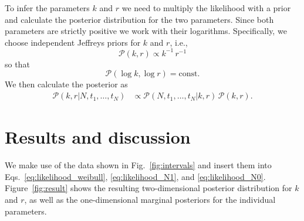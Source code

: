\documentclass[fleqn,usenatbib]{mnras}
\newcommand{\new}[1]{#1}
\begin{document}
To infer the parameters $k$ and $r$ we need to multiply the likelihood with a prior and calculate the posterior distribution for the two parameters. Since both parameters are strictly positive we work with their logarithms. Specifically, we choose independent Jeffreys priors for $k$ and $r$, i.e.,
\begin{equation}
	\mathcal{P}(k,r) \propto k^{-1} \, r^{-1}
\end{equation}
\new{so that
\begin{equation}
	\mathcal{P}(\log k,\log r) = \mathrm{const}.
\end{equation}}
We then calculate the posterior as
\begin{align}
	\mathcal{P}(k,r|N,t_1,\dots,t_N) &\propto \mathcal{P}(N,t_1,\dots,t_N|k,r)\,\mathcal{P}(k,r).
\end{align}


\section{Results and discussion}
\label{sec:results}

We make use of the data shown in Fig.~\ref{fig:intervals} and insert them into Eqs.~\eqref{eq:likelihood_weibull}, \eqref{eq:likelihood_N1}, and \eqref{eq:likelihood_N0}. Figure~\ref{fig:result} shows the resulting two-dimensional posterior distribution for $k$ and $r$, as well as the one-dimensional marginal posteriors for the individual parameters.
\end{document}
